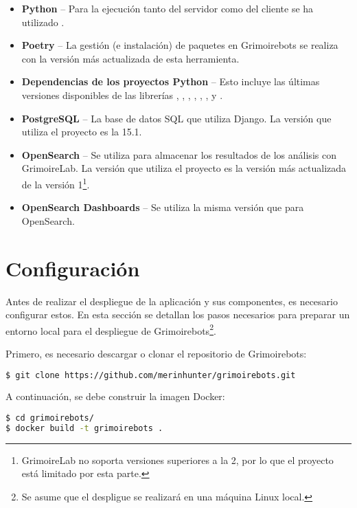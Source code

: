 \begin{itemize}
    \item \textbf{Python} -- Para la ejecución tanto del servidor como del cliente se ha utilizado .
    \item \textbf{Poetry} -- La gestión (e instalación) de paquetes en Grimoirebots se realiza con la versión más actualizada de esta herramienta.
    \item \textbf{Dependencias de los proyectos Python} -- Esto incluye las últimas versiones disponibles de las librerías , , , , , ,  y .
    \item \textbf{PostgreSQL} -- La base de datos SQL que utiliza Django. La versión que utiliza el proyecto es la 15.1.
    \item \textbf{OpenSearch} -- Se utiliza para almacenar los resultados de los análisis con GrimoireLab. La versión que utiliza el proyecto es la versión más actualizada de la versión 1\footnote{GrimoireLab no soporta versiones superiores a la 2, por lo que el proyecto está limitado por esta parte.}.
    \item \textbf{OpenSearch Dashboards} -- Se utiliza la misma versión que para OpenSearch.
\end{itemize}

\section{Configuración}

Antes de realizar el despliegue de la aplicación y sus componentes, es necesario configurar estos. En esta sección se detallan los pasos necesarios para preparar un entorno local para el despliegue de Grimoirebots\footnote{Se asume que el despligue se realizará en una máquina Linux local.}.

Primero, es necesario descargar o clonar el repositorio de Grimoirebots:

\begin{lstlisting}[language=bash]
$ git clone https://github.com/merinhunter/grimoirebots.git
\end{lstlisting}

A continuación, se debe construir la imagen Docker:

\begin{lstlisting}[language=bash]
$ cd grimoirebots/
$ docker build -t grimoirebots .
\end{lstlisting}

